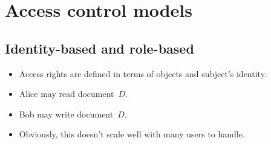 \mode*




\section{Access control models}

\subsection{Identity-based and role-based}

\begin{frame}
  \begin{definition}
    \begin{itemize}
      \item Access rights are defined in terms of objects and subject's 
        identity.
    \end{itemize}
  \end{definition}

  \pause

  \begin{example}
    \begin{itemize}
      \item Alice may read document~\(D\).
      \item Bob may write document~\(D\).
    \end{itemize}
  \end{example}
\end{frame}

\begin{frame}
  \begin{remark}
    \begin{itemize}
      \item Obviously, this doesn't scale well with many users to handle.
    \end{itemize}
  \end{remark}
\end{frame}

